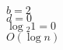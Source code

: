 \documentclass{article}
\begin{document}
                                                                                                                                                                                                                                                                                                                                                                                                                                                                                                                                                                                                                                                                        $b=2$\\
                                                                                                                                                                                                                                                                                                                                                                                                                                                                                                                                                                                                                                                                                $d=0$\\
                                                                                                                                                                                                                                                                                                                                                                                                                                                                                                                                                                                                                                                                                        $\log{_2}{1} = 0$\\
                                                                                                                                                                                                                                                                                                                                                                                                                                                                                                                                                                                                                                                                                                $O(\log{n})$ \\
\end{document}
